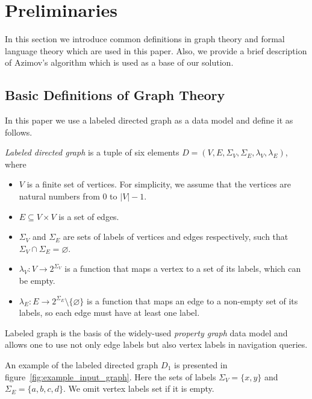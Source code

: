 \section{Preliminaries}

In this section we introduce common definitions in graph theory and formal language theory which are used in this paper.
Also, we provide a brief description of Azimov's algorithm which is used as a base of our solution.

\subsection{Basic Definitions of Graph Theory}

In this paper we use a labeled directed graph as a data model and define it as follows.
\begin{definition} \emph{Labeled directed graph} is a tuple of six elements $D = (V, E, \Sigma_V, \Sigma_E, \lambda_V, \lambda_E)$, where
\begin{itemize}
    \item $V$ is a finite set of vertices. For simplicity, we assume that the vertices are natural numbers from $0$ to $|V|-1$.
    \item $E \subseteq V \times V$ is a set of edges.
    \item $\Sigma_V$ and $\Sigma_E$ are sets of labels of vertices and edges respectively, such that $\Sigma_V \cap \Sigma_E = \varnothing$.
    \item $\lambda_V : V \xrightarrow{} 2^{\Sigma_V}$ is a function that maps a vertex to a set of its labels, which can be empty.
    \item $\lambda_E : E \xrightarrow{} 2^{\Sigma_E} \setminus \{\varnothing\}$ is a function that maps an edge to a non-empty set of its labels, so each edge must have at least one label.
\end{itemize} 
\end{definition}
Labeled graph is the basis of the widely-used \textit{property graph} data model and allows one to use not only edge labels but also vertex labels in navigation queries.

An example of the labeled directed graph $D_1$ is presented in figure~\ref{fig:example_input_graph}. Here the sets of labels $\Sigma_V = \{x, y\}$ and $\Sigma_E = \{a, b, c, d\}$.
We omit vertex labels set if it is empty.

